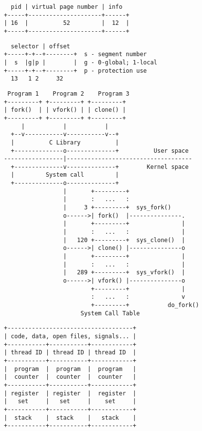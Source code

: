 \documentclass[varwidth,crop,multi={verbatim}]{standalone}
\begin{document}
\begin{verbatim}
  pid | virtual page number | info
+-----+---------------------+------+
| 16  |          52         |  12  |
+-----+---------------------+------+
\end{verbatim}

\begin{verbatim}
  selector | offset
+-----+-+--+--------+  s - segment number
|  s  |g|p |        |  g - 0-global; 1-local
+-----+-+--+--------+  p - protection use
  13   1 2     32
\end{verbatim}

\begin{verbatim}
 Program 1    Program 2    Program 3
+---------+ +---------+ +---------+
| fork()  | | vfork() | | clone() |
+---------+ +---------+ +---------+
     |           |           |
  +--v-----------v-----------v--+
  |          C Library          |
  +--------------o--------------+          User space
-----------------|------------------------------------
  +--------------v--------------+        Kernel space
  |         System call         |
  +--------------o--------------+
                 |       +---------+
                 |       :   ...   :
                 |     3 +---------+  sys_fork()
                 o------>| fork()  |---------------.
                 |       +---------+               |
                 |       :   ...   :               |
                 |   120 +---------+  sys_clone()  |
                 o------>| clone() |---------------o
                 |       +---------+               |
                 |       :   ...   :               |
                 |   289 +---------+  sys_vfork()  |
                 o------>| vfork() |---------------o
                         +---------+               |
                         :   ...   :               v
                         +---------+           do_fork()
                      System Call Table
\end{verbatim}

\begin{verbatim}
+------------------------------------+
| code, data, open files, signals... |
+-----------+-----------+------------+
| thread ID | thread ID | thread ID  |
+-----------+-----------+------------+
|  program  |  program  |  program   |
|  counter  |  counter  |  counter   |
+-----------+-----------+------------+
| register  | register  |  register  |
|   set     |   set     |    set     |
+-----------+-----------+------------+
|  stack    |  stack    |   stack    |
+-----------+-----------+------------+
\end{verbatim}
\end{document}
